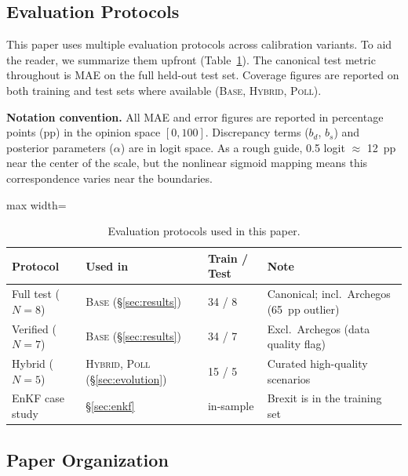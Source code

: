 \documentclass[12pt]{article}
\begin{document}
\subsection{Evaluation Protocols}

This paper uses multiple evaluation protocols across calibration variants. To aid the reader, we summarize them upfront (Table~\ref{tab:protocols}). The canonical test metric throughout is MAE on the full held-out test set. Coverage figures are reported on both training and test sets where available (\textsc{Base}, \textsc{Hybrid}, \textsc{Poll}).

\textbf{Notation convention.} All MAE and error figures are reported in percentage points (pp) in the opinion space $[0, 100]$. Discrepancy terms ($b_d$, $b_s$) and posterior parameters ($\alpha$) are in logit space. As a rough guide, 0.5 logit $\approx$ 12~pp near the center of the scale, but the nonlinear sigmoid mapping means this correspondence varies near the boundaries.

\begin{table}[H]
\centering
\caption{Evaluation protocols used in this paper.}
\label{tab:protocols}
\begin{adjustbox}{max width=\textwidth}
\begin{tabular}{@{}llll@{}}
\toprule
Protocol & Used in & Train / Test & Note \\
\midrule
Full test ($N{=}8$) & \textsc{Base} (\S\ref{sec:results}) & 34 / 8 & Canonical; incl.\ Archegos (65~pp outlier) \\
Verified ($N{=}7$) & \textsc{Base} (\S\ref{sec:results}) & 34 / 7 & Excl.\ Archegos (data quality flag) \\
Hybrid ($N{=}5$) & \textsc{Hybrid}, \textsc{Poll} (\S\ref{sec:evolution}) & 15 / 5 & Curated high-quality scenarios \\
EnKF case study & \S\ref{sec:enkf} & in-sample & Brexit is in the training set \\
\bottomrule
\end{tabular}
\end{adjustbox}
\end{table}

\subsection{Paper Organization}
\end{document}
